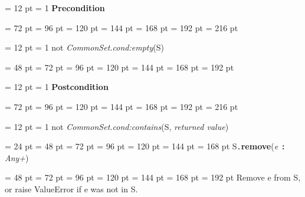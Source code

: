 {{{{{{\par \pagebreak[3.100000] \noindent \hangindent = 12 pt \hangafter = 1 
{\bf Precondition\/}\par}
{\par \noindent  \leftskip = 72 pt  \leftmargini = 96 pt  \leftmarginii = 120 pt  \leftmarginiii = 144 pt  \leftmarginiv = 168 pt  \leftmarginv = 192 pt  \leftmarginvi = 216 pt {\par \noindent
{\par \pagebreak[3.000000] \noindent \hangindent = 12 pt \hangafter = 1 
not  {\em CommonSet.cond:empty\/}(S)\par}
\par}
\par}
\par}
\par}
{\par \noindent  \leftskip = 48 pt  \leftmargini = 72 pt  \leftmarginii = 96 pt  \leftmarginiii = 120 pt  \leftmarginiv = 144 pt  \leftmarginv = 168 pt  \leftmarginvi = 192 pt {\par \noindent
{\par \pagebreak[3.100000] \noindent \hangindent = 12 pt \hangafter = 1 
{\bf Postcondition\/}\par}
{\par \noindent  \leftskip = 72 pt  \leftmargini = 96 pt  \leftmarginii = 120 pt  \leftmarginiii = 144 pt  \leftmarginiv = 168 pt  \leftmarginv = 192 pt  \leftmarginvi = 216 pt {\par \noindent
{\par \pagebreak[3.000000] \noindent \hangindent = 12 pt \hangafter = 1 
not  {\em CommonSet.cond:contains\/}(S, {\em returned value\/})\par}
\par}
\par}
\par}
\par}
\par}
\par}
{\par \noindent  \leftskip = 24 pt  \leftmargini = 48 pt  \leftmarginii = 72 pt  \leftmarginiii = 96 pt  \leftmarginiv = 120 pt  \leftmarginv = 144 pt  \leftmarginvi = 168 pt S{\tt .\/}{\bf {\large {\bf remove\/}}\/}({\em e\/}~{\bf :}  {\em Any+\/}){\par \noindent
{\par \noindent  \leftskip = 48 pt  \leftmargini = 72 pt  \leftmarginii = 96 pt  \leftmarginiii = 120 pt  \leftmarginiv = 144 pt  \leftmarginv = 168 pt  \leftmarginvi = 192 pt  Remove e from S, or raise ValueError if e was not in S.\par}
}}}
